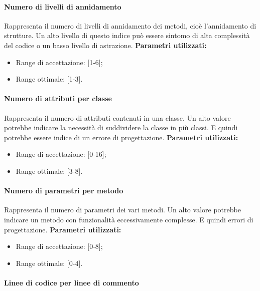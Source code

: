 \paragraph{Numero di livelli di annidamento}

Rappresenta il numero di livelli di annidamento dei metodi, cioè l'annidamento di strutture.\newline
Un alto livello di questo indice può essere sintomo di alta complessità del codice o un basso livello di astrazione.\newline
\textbf{Parametri utilizzati:}
\begin{itemize}
	\item Range di accettazione: [1-6];
	\item Range ottimale: [1-3].
\end{itemize}

\paragraph{Numero di attributi per classe}

Rappresenta il numero di attributi contenuti in una classe. Un alto valore potrebbe indicare la necessità di suddividere la classe in più classi.
E quindi potrebbe essere indice di un errore di progettazione.\newline
\textbf{Parametri utilizzati:}
\begin{itemize}
	\item Range di accettazione: [0-16];
	\item Range ottimale: [3-8].
\end{itemize}

\paragraph{Numero di parametri per metodo}

Rappresenta il numero di parametri dei vari metodi. Un alto valore potrebbe 
indicare un metodo con funzionalità eccessivamente complesse. E quindi errori 
di progettazione.\newline
\textbf{Parametri utilizzati:}
\begin{itemize}
	\item Range di accettazione: [0-8];
	\item Range ottimale: [0-4].
\end{itemize}

\paragraph{Linee di codice per linee di commento}

